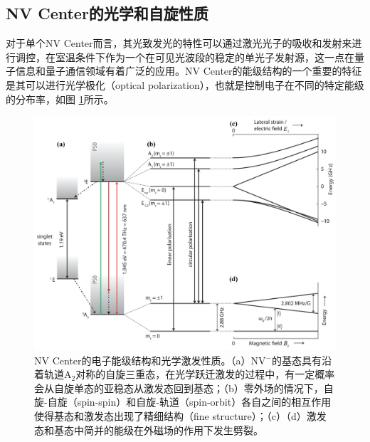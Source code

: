 \documentclass[type = bachelor, oneside]{whu-thesis}
\begin{document}
\subsection{NV Center的光学和自旋性质}
对于单个NV Center而言，其光致发光的特性可以通过激光光子的吸收和发射来进行调控，在室温条件下作为一个在可见光波段的稳定的单光子发射源，这一点在量子信息和量子通信领域有着广泛的应用。NV Center的能级结构的一个重要的特征是其可以进行光学极化（optical polarization），也就是控制电子在不同的特定能级的分布率，如图 \ref{fig: Optical Properties}所示。

\begin{figure}
  \centering
  \includegraphics[width=1.0\textwidth]{figures/Chapter 2/Optical Properties.png}
  \caption[NV Center的电子能级结构和光学激发性质]{NV Center的电子能级结构和光学激发性质。（a）NV$^-$的基态具有沿着轨道A$_2$对称的自旋三重态，在光学跃迁激发的过程中，有一定概率会从自旋单态的亚稳态从激发态回到基态；（b）零外场的情况下，自旋-自旋（spin-spin）和自旋-轨道（spin-orbit）各自之间的相互作用使得基态和激发态出现了精细结构（fine structure）；（c）（d）激发态和基态中简并的能级在外磁场的作用下发生劈裂。}
  \label{fig: Optical Properties}
\end{figure}
\end{document}
